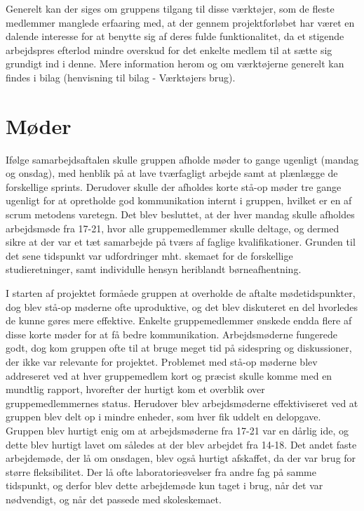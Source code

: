 Generelt kan der siges om gruppens tilgang til disse værktøjer, som de fleste medlemmer manglede erfaaring med, at der gennem projektforløbet har været en dalende interesse for at benytte sig af deres fulde funktionalitet, da et stigende arbejdspres efterlod mindre overskud for det enkelte medlem til at sætte sig grundigt ind i denne. Mere information herom og om værktøjerne generelt kan findes i bilag (henvisning til bilag - Værktøjers brug).

\section{Møder}
Ifølge samarbejdsaftalen skulle gruppen afholde møder to gange ugenligt (mandag og onsdag), med henblik på at lave tværfagligt arbejde samt at plænlægge
de forskellige sprints. Derudover skulle der afholdes korte stå-op møder tre gange ugenligt for at opretholde god kommunikation internt i gruppen,
hvilket er en af scrum metodens varetegn.
Det blev besluttet, at der hver mandag skulle afholdes arbejdsmøde fra 17-21, hvor alle gruppemedlemmer skulle deltage, og dermed sikre at der var
et tæt samarbejde på tværs af faglige kvalifikationer. Grunden til det sene tidspunkt var udfordringer mht. skemaet for de forskellige studieretninger,
samt individulle hensyn heriblandt børneafhentning. 

I starten af projektet formåede gruppen at overholde de aftalte mødetidspunkter, dog blev stå-op møderne ofte uproduktive, og det blev diskuteret en del hvorledes de kunne gøres mere effektive. Enkelte gruppemedlemmer ønskede endda flere af disse korte møder for at få bedre kommunikation. Arbejdsmøderne fungerede godt, dog kom gruppen ofte til at bruge meget tid på sidespring og diskussioner, der ikke var relevante for projektet. Problemet med stå-op møderne blev addreseret ved at hver gruppemedlem kort og præcist skulle komme med en mundtlig rapport, hvorefter der hurtigt kom et overblik over gruppemedlemmernes status. Herudover blev arbejdsmøderne effektiviseret ved at gruppen blev delt op i mindre enheder, som hver fik uddelt en delopgave. Gruppen blev hurtigt enig om at arbejdsmøderne fra 17-21 var en dårlig ide, og dette blev hurtigt lavet om således at der blev arbejdet fra 14-18. Det andet faste arbejdemøde, der lå om onsdagen, blev også hurtigt afskaffet, da der var brug for større fleksibilitet. Der lå ofte laboratorieøvelser fra andre fag på samme tidspunkt, og derfor blev dette arbejdemøde kun taget i brug, når det var nødvendigt, og når det passede med skoleskemaet.    

